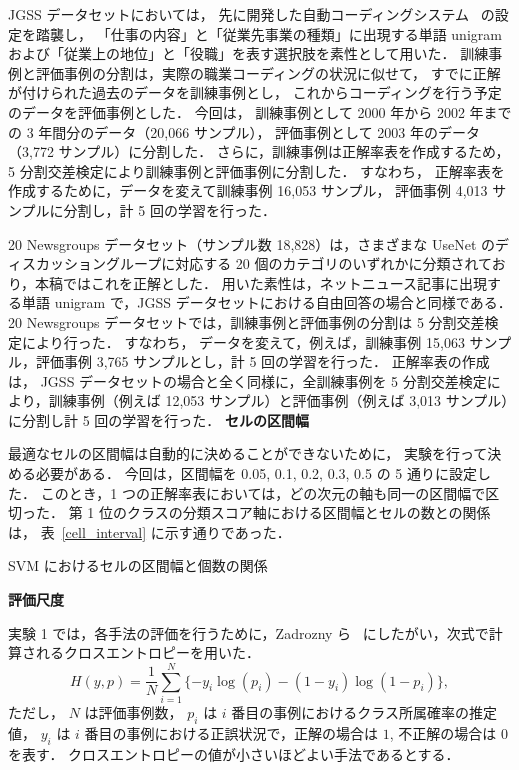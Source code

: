 \documentclass[japanese]{jnlp_1.4}
\begin{document}
JGSS データセットにおいては，
先に開発した自動コーディングシステム~\cite{Takahashi05a} の設定を踏襲し，
「仕事の内容」と「従業先事業の種類」に出現する単語 unigram および「従業上の地位」と「役職」を表す選択肢を素性として用いた．
訓練事例と評価事例の分割は，実際の職業コーディングの状況に似せて，
すでに正解が付けられた過去のデータを訓練事例とし，
これからコーディングを行う予定のデータを評価事例とした．
今回は，
訓練事例として 2000 年から 2002 年までの 3 年間分のデータ（20,066 サンプル），
評価事例として 2003 年のデータ（3,772 サンプル）に分割した．
さらに，訓練事例は正解率表を作成するため，5 分割交差検定により訓練事例と評価事例に分割した．
すなわち，
正解率表を作成するために，データを変えて訓練事例 16,053 サンプル，
評価事例 4,013 サンプルに分割し，計 5 回の学習を行った．

20 Newsgroups データセット（サンプル数 18,828）は，さまざまな UseNet のディスカッショングループに対応する 20 個のカテゴリのいずれかに分類されており，本稿ではこれを正解とした．
用いた素性は，ネットニュース記事に出現する単語 unigram で，JGSS データセットにおける自由回答の場合と同様である．
20 Newsgroups データセットでは，訓練事例と評価事例の分割は 5 分割交差検定により行った．
すなわち，
データを変えて，例えば，訓練事例 15,063 サンプル，評価事例 3,765 サンプルとし，計 5 回の学習を行った．
正解率表の作成は，
JGSS データセットの場合と全く同様に，全訓練事例を 5 分割交差検定により，訓練事例（例えば 12,053 サンプル）と評価事例（例えば 3,013 サンプル）に分割し計 5 回の学習を行った．
    \clearpage
\noindent
{\bf セルの区間幅}

最適なセルの区間幅は自動的に決めることができないために，
実験を行って決める必要がある．
今回は，区間幅を 0.05, 0.1, 0.2, 0.3, 0.5 の 5 通りに設定した．
このとき，1 つの正解率表においては，どの次元の軸も同一の区間幅で区切った．
第 1 位のクラスの分類スコア軸における区間幅とセルの数との関係は，
表~\ref{cell_interval} に示す通りであった．


\begin{table}[t]
\begin{center}
\caption{SVM におけるセルの区間幅と個数の関係 }
\label{cell_interval}

\end{center}
\end{table}


\vspace{1\baselineskip}
\noindent
{\bf 評価尺度}

実験 1 では，各手法の評価を行うために，Zadrozny ら~\cite{Zadrozny05} にしたがい，次式で計算されるクロスエントロピーを用いた．
\begin{equation}
 H(y,p) = \frac{1}{N}\sum_{i=1}^N\{-y_{i}\log(p_{i}) - (1-y_{i})\log(1-p_{i})\}, 
\end{equation}
ただし，
$N$ は評価事例数，
$p_{i}$ は $i$ 番目の事例におけるクラス所属確率の推定値，
$y_{i}$ は $i$ 番目の事例における正誤状況で，正解の場合は $1$, 不正解の場合は $0$ を表す．
クロスエントロピーの値が小さいほどよい手法であるとする．
\end{document}
